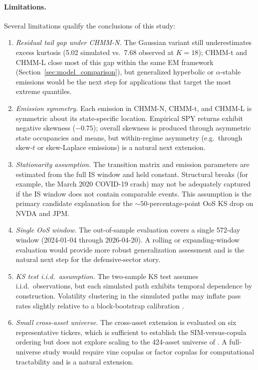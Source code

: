 \paragraph{Limitations.}
Several limitations qualify the conclusions of this study:
\begin{enumerate}
    \item \textit{Residual tail gap under CHMM-N.}
    The Gaussian variant still underestimates excess kurtosis (5.02 simulated vs.\ 7.68 observed at $K = 18$); CHMM-t and CHMM-L close most of this gap within the same EM framework (Section~\ref{sec:model_comparison}), but generalized hyperbolic or $\alpha$-stable emissions would be the next step for applications that target the most extreme quantiles.

    \item \textit{Emission symmetry.}
    Each emission in CHMM-N, CHMM-t, and CHMM-L is symmetric about its state-specific location.
    Empirical SPY returns exhibit negative skewness ($-0.75$); overall skewness is produced through asymmetric state occupancies and means, but within-regime asymmetry (e.g.\ through skew-$t$ or skew-Laplace emissions) is a natural next extension.

    \item \textit{Stationarity assumption.}
    The transition matrix and emission parameters are estimated from the full IS window and held constant.
    Structural breaks (for example, the March 2020 COVID-19 crash) may not be adequately captured if the IS window does not contain comparable events.
    This assumption is the primary candidate explanation for the $\sim 50$-percentage-point OoS KS drop on NVDA and JPM.

    \item \textit{Single OoS window.}
    The out-of-sample evaluation covers a single 572-day window (2024-01-04 through 2026-04-20).
    A rolling or expanding-window evaluation would provide more robust generalization assessment and is the natural next step for the defensive-sector story.

    \item \textit{KS test i.i.d.\ assumption.}
    The two-sample KS test assumes i.i.d.\ observations, but each simulated path exhibits temporal dependence by construction.
    Volatility clustering in the simulated paths may inflate pass rates slightly relative to a block-bootstrap calibration \cite{alswaidan2026hybrid}.

    \item \textit{Small cross-asset universe.}
    The cross-asset extension is evaluated on six representative tickers, which is sufficient to establish the SIM-versus-copula ordering but does not explore scaling to the 424-asset universe of \citet{alswaidan2026hybrid}.
    A full-universe study would require vine copulas or factor copulas for computational tractability and is a natural extension.


\end{enumerate}
